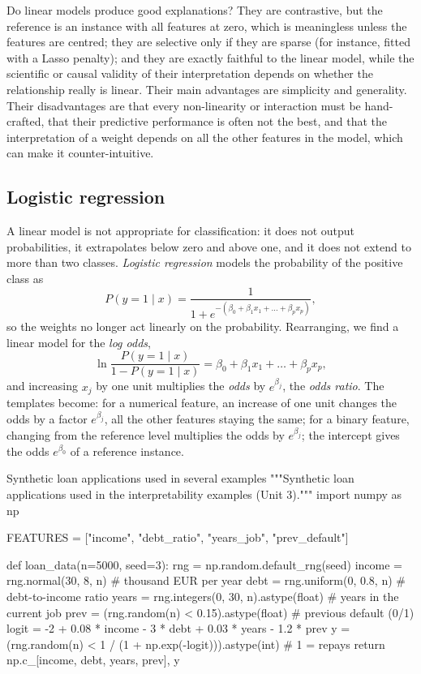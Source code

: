 Do linear models produce good explanations? They are contrastive, but the reference is an instance
with all features at zero, which is meaningless unless the features are centred; they are
selective only if they are sparse (for instance, fitted with a Lasso penalty); and they are exactly faithful to
the linear model, while the scientific or causal validity of their interpretation depends on whether the
relationship really is linear. Their main advantages are simplicity and
generality. Their disadvantages are that every non-linearity or interaction must be hand-crafted, that their
predictive performance is often not the best, and that the interpretation of a weight depends on all
the other features in the model, which can make it counter-intuitive.

\subsection{Logistic regression}

A linear model is not appropriate for classification: it does not output probabilities, it
extrapolates below zero and above one, and it does not extend to more than two classes.
\emph{Logistic regression} models the probability of the positive class as
\begin{equation}
  P(y=1\mid x)=\frac{1}{1+e^{-(\beta_0+\beta_1x_1+\dots+\beta_px_p)}},
\end{equation}
so the weights no longer act linearly on the probability. Rearranging, we find a linear model for
the \emph{log odds},
\begin{equation}
  \ln\frac{P(y=1\mid x)}{1-P(y=1\mid x)}=\beta_0+\beta_1x_1+\dots+\beta_px_p,
\end{equation}
and increasing $x_j$ by one unit multiplies the \emph{odds} by $e^{\beta_j}$, the \emph{odds
ratio}. The templates become: for a numerical feature, an increase of one unit changes the odds by
a factor $e^{\beta_j}$, all the other features staying the same; for a binary feature, changing from
the reference level multiplies the odds by $e^{\beta_j}$; the intercept gives the odds $e^{\beta_0}$
of a reference instance.

\begin{pylisting}[label={lst:loans}]{Synthetic loan applications used in several examples}
"""Synthetic loan applications used in the interpretability examples (Unit 3)."""
import numpy as np

FEATURES = ["income", "debt_ratio", "years_job", "prev_default"]

def loan_data(n=5000, seed=3):
    rng = np.random.default_rng(seed)
    income = rng.normal(30, 8, n)                       # thousand EUR per year
    debt = rng.uniform(0, 0.8, n)                       # debt-to-income ratio
    years = rng.integers(0, 30, n).astype(float)        # years in the current job
    prev = (rng.random(n) < 0.15).astype(float)         # previous default (0/1)
    logit = -2 + 0.08 * income - 3 * debt + 0.03 * years - 1.2 * prev
    y = (rng.random(n) < 1 / (1 + np.exp(-logit))).astype(int)     # 1 = repays
    return np.c_[income, debt, years, prev], y
\end{pylisting}

